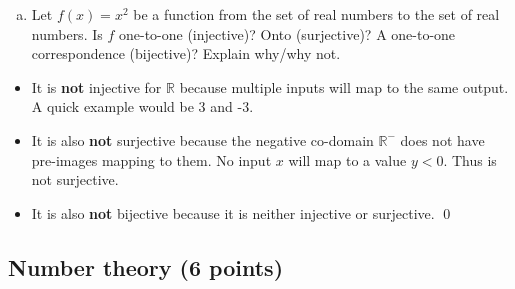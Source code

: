 \documentclass[12pt]{article}
\newcommand{\R}{\mathbb{R}}
\begin{document}
\begin{enumerate}[a)]

  Looking at the diagram, I will try to create a counterexample, because it looks like that's whats needed... \\

  Let $A = B = \{1\}$ and $ C = \emptyset$.

  $A - C = A - \emptyset = A = B = \{1\}$. \\
  $B - C = B - \emptyset = B = A = \{1\}$. \\

  $(A - C) \cap (B - C) = A \cap B = A \cap A = A = B = \{1\}$.

  $\{1\} \neq \emptyset$ and therefore we disproved the proposition by counterexample.
  \qed
  
\medskip

\item Let $f(x)=x^2$ be a function from the set of real numbers to the
  set of real numbers. Is $f$ one-to-one (injective)? Onto
  (surjective)? A one-to-one correspondence (bijective)? Explain
  why/why not.
\end{enumerate}

\begin{itemize}
\item It is \textbf{not} injective for $\R$ because multiple inputs will map to the same output. A quick example would be 3 and -3.
\item It is also \textbf{not} surjective because the negative co-domain $\R^-$ does not have pre-images mapping to them. No input $x$ will map to a value $y < 0$. Thus is not surjective.
\item It is also \textbf{not} bijective because it is neither injective or surjective. \qed
\end{itemize}

\newpage

\subsection{Number theory (6 points)}
\label{sec:number-theory}
\end{document}
